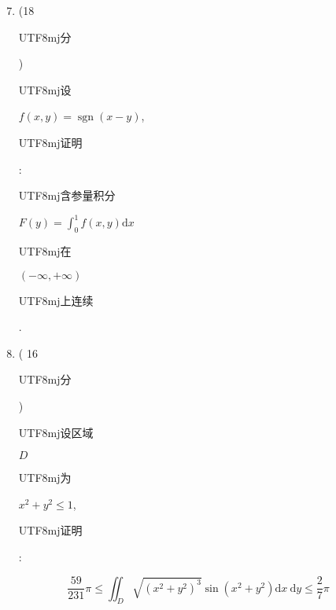 \documentclass[10pt]{article}
\begin{document}
\begin{enumerate}
  \setcounter{enumi}{6}
  \item (18 \begin{CJK}{UTF8}{mj}分\end{CJK}) \begin{CJK}{UTF8}{mj}设\end{CJK} $f(x, y)=\operatorname{sgn}(x-y)$, \begin{CJK}{UTF8}{mj}证明\end{CJK}: \begin{CJK}{UTF8}{mj}含参量积分\end{CJK} $F(y)=\int_{0}^{1} f(x, y) \mathrm{d} x$ \begin{CJK}{UTF8}{mj}在\end{CJK} $(-\infty,+\infty)$ \begin{CJK}{UTF8}{mj}上连续\end{CJK}.

  \item ( 16 \begin{CJK}{UTF8}{mj}分\end{CJK}) \begin{CJK}{UTF8}{mj}设区域\end{CJK} $D$ \begin{CJK}{UTF8}{mj}为\end{CJK} $x^{2}+y^{2} \leqslant 1$, \begin{CJK}{UTF8}{mj}证明\end{CJK}:

\end{enumerate}
$$
\frac{59}{231} \pi \leqslant \iint_{D} \sqrt{\left(x^{2}+y^{2}\right)^{3}} \sin \left(x^{2}+y^{2}\right) \mathrm{d} x \mathrm{~d} y \leqslant \frac{2}{7} \pi
$$
\end{document}
